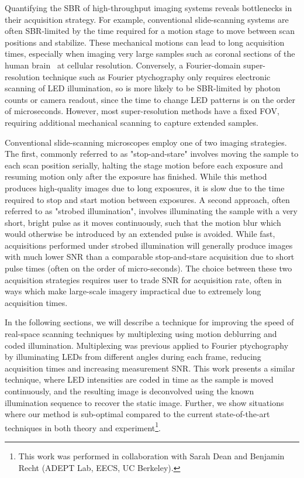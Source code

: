 Quantifying the SBR of high-throughput imaging systems reveals bottlenecks in their acquisition strategy. For example, conventional slide-scanning systems are often SBR-limited by the time required for a motion stage to move between scan positions and stabilize. These mechanical motions can lead to long acquisition times, especially when imaging very large samples such as coronal sections of the human brain~\cite{Grinberg2007} at cellular resolution.
Conversely, a Fourier-domain super-resolution technique such as Fourier ptychography only requires electronic scanning of LED illumination, so is more likely to be SBR-limited by photon counts or camera readout, since the time to change LED patterns is on the order of microseconds. However, most super-resolution methods have a fixed FOV, requiring additional mechanical scanning to capture extended samples.

Conventional slide-scanning microscopes employ one of two imaging strategies. The first, commonly referred to as "stop-and-stare" involves moving the sample to each scan position serially, halting the stage motion before each exposure and resuming motion only after the exposure has finished. While this method produces high-quality images due to long exposures, it is slow due to the time required to stop and start motion between exposures. A second approach, often referred to as "strobed illumination", involves illuminating the sample with a very short, bright pulse as it moves continuously, such that the motion blur which would otherwise be introduced by an extended pulse is avoided. While fast, acquisitions performed under strobed illumination will generally produce images with much lower SNR than a comparable stop-and-stare acquisition due to short pulse times (often on the order of micro-seconds). The choice between these two acquisition strategies requires user to trade SNR for acquisition rate, often in ways which make large-scale imagery impractical due to extremely long acquisition times.

In the following sections, we will describe a technique for improving the speed of real-space scanning techniques by multiplexing using motion deblurring and coded illumination. Multiplexing was previous applied to Fourier ptychography~\cite{Tian2014} by illuminating LEDs from different angles during each frame, reducing acquisition times and increasing measurement SNR. This work presents a similar technique, where LED intensities are coded in time as the sample is moved continuously, and the resulting image is deconvolved using the known illumination sequence to recover the static image. Further, we show situations where our method is sub-optimal compared to the current state-of-the-art techniques in both theory and experiment\footnote{This work was performed in collaboration with Sarah Dean and Benjamin Recht (ADEPT Lab, EECS, UC Berkeley).}.

